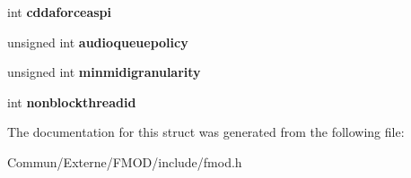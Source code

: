 \begin{DoxyCompactItemize}
\item 
int {\bfseries cddaforceaspi}\hypertarget{struct_f_m_o_d___c_r_e_a_t_e_s_o_u_n_d_e_x_i_n_f_o_a6eba4eee8813485c49042453ffdbe9bf}{}\label{struct_f_m_o_d___c_r_e_a_t_e_s_o_u_n_d_e_x_i_n_f_o_a6eba4eee8813485c49042453ffdbe9bf}

\item 
unsigned int {\bfseries audioqueuepolicy}\hypertarget{struct_f_m_o_d___c_r_e_a_t_e_s_o_u_n_d_e_x_i_n_f_o_a23344f4eafd6e30b53443c6e63045684}{}\label{struct_f_m_o_d___c_r_e_a_t_e_s_o_u_n_d_e_x_i_n_f_o_a23344f4eafd6e30b53443c6e63045684}

\item 
unsigned int {\bfseries minmidigranularity}\hypertarget{struct_f_m_o_d___c_r_e_a_t_e_s_o_u_n_d_e_x_i_n_f_o_accd465df1d73435daae0d2ef87026362}{}\label{struct_f_m_o_d___c_r_e_a_t_e_s_o_u_n_d_e_x_i_n_f_o_accd465df1d73435daae0d2ef87026362}

\item 
int {\bfseries nonblockthreadid}\hypertarget{struct_f_m_o_d___c_r_e_a_t_e_s_o_u_n_d_e_x_i_n_f_o_a99017c1720cfae07e5bd5abacf3ac2a7}{}\label{struct_f_m_o_d___c_r_e_a_t_e_s_o_u_n_d_e_x_i_n_f_o_a99017c1720cfae07e5bd5abacf3ac2a7}

\end{DoxyCompactItemize}


The documentation for this struct was generated from the following file\+:\begin{DoxyCompactItemize}
\item 
Commun/\+Externe/\+F\+M\+O\+D/include/fmod.\+h\end{DoxyCompactItemize}
